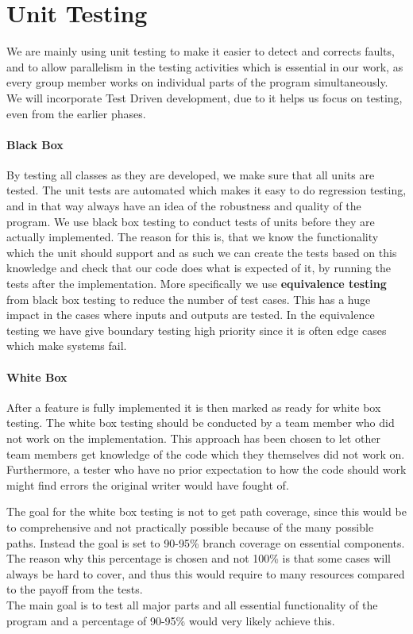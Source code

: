 \section{Unit Testing}
We are mainly using unit testing to make it easier to detect and corrects faults, and to allow parallelism in the testing activities which is essential in our work, as every group member works on individual parts of the program simultaneously. We will incorporate Test Driven development, due to it helps us focus on testing, even from the earlier phases. 

\paragraph{Black Box}
By testing all classes as they are developed, we make sure that all units are tested. The unit tests are automated which makes it easy to do regression testing, and in that way always have an idea of the robustness and quality of the program.
We use black box testing to conduct tests of units before they are actually implemented. The reason for this is, that we know the functionality which the unit should support and as such we can create the tests based on this knowledge and check that our code does what is expected of it, by running the tests after the implementation.
More specifically we use \textbf{equivalence testing} from black box testing to reduce the number of test cases. This has a huge impact in the cases where inputs and outputs are tested. In the equivalence testing we have give boundary testing high priority since it is often edge cases which make systems fail.

\paragraph{White Box}
After a feature is fully implemented it is then marked as ready for white box testing. The white box testing should be conducted by a team member who did not work on the implementation. This approach has been chosen to let other team members get knowledge of the code which they themselves did not work on. Furthermore, a tester who have no prior expectation to how the code should work might find errors the original writer would have fought of.

 The goal for the white box testing is not to get path coverage, since this would be to comprehensive and not practically possible because of the many possible paths. Instead the goal is set to 90-95\% branch coverage on essential components. The reason why this percentage is chosen and not 100\% is that some cases will always be hard to cover, and thus this would require to many resources compared to the payoff from the tests. \\
 The main goal is to test all major parts and all essential functionality of the program and a percentage of 90-95\% would very likely achieve this.
 
